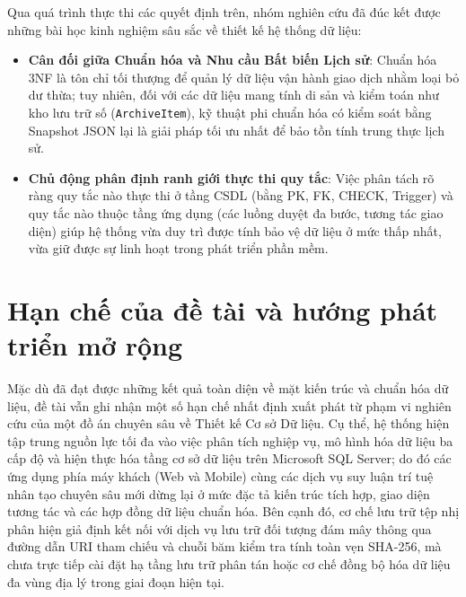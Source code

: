 Qua quá trình thực thi các quyết định trên, nhóm nghiên cứu đã đúc kết được những bài học kinh nghiệm sâu sắc về thiết kế hệ thống dữ liệu:
\begin{itemize}
    \item \textbf{Cân đối giữa Chuẩn hóa và Nhu cầu Bất biến Lịch sử}: Chuẩn hóa 3NF là tôn chỉ tối thượng để quản lý dữ liệu vận hành giao dịch nhằm loại bỏ dư thừa; tuy nhiên, đối với các dữ liệu mang tính di sản và kiểm toán như kho lưu trữ số (\texttt{ArchiveItem}), kỹ thuật phi chuẩn hóa có kiểm soát bằng Snapshot JSON lại là giải pháp tối ưu nhất để bảo tồn tính trung thực lịch sử.
    \item \textbf{Chủ động phân định ranh giới thực thi quy tắc}: Việc phân tách rõ ràng quy tắc nào thực thi ở tầng CSDL (bằng PK, FK, CHECK, Trigger) và quy tắc nào thuộc tầng ứng dụng (các luồng duyệt đa bước, tương tác giao diện) giúp hệ thống vừa duy trì được tính bảo vệ dữ liệu ở mức thấp nhất, vừa giữ được sự linh hoạt trong phát triển phần mềm.
\end{itemize}

\section{Hạn chế của đề tài và hướng phát triển mở rộng}
\label{s:c7_limitations_future}

Mặc dù đã đạt được những kết quả toàn diện về mặt kiến trúc và chuẩn hóa dữ liệu, đề tài vẫn ghi nhận một số hạn chế nhất định xuất phát từ phạm vi nghiên cứu của một đồ án chuyên sâu về Thiết kế Cơ sở Dữ liệu. Cụ thể, hệ thống hiện tập trung nguồn lực tối đa vào việc phân tích nghiệp vụ, mô hình hóa dữ liệu ba cấp độ và hiện thực hóa tầng cơ sở dữ liệu trên Microsoft SQL Server; do đó các ứng dụng phía máy khách (Web và Mobile) cùng các dịch vụ suy luận trí tuệ nhân tạo chuyên sâu mới dừng lại ở mức đặc tả kiến trúc tích hợp, giao diện tương tác và các hợp đồng dữ liệu chuẩn hóa. Bên cạnh đó, cơ chế lưu trữ tệp nhị phân hiện giả định kết nối với dịch vụ lưu trữ đối tượng đám mây thông qua đường dẫn URI tham chiếu và chuỗi băm kiểm tra tính toàn vẹn SHA-256, mà chưa trực tiếp cài đặt hạ tầng lưu trữ phân tán hoặc cơ chế đồng bộ hóa dữ liệu đa vùng địa lý trong giai đoạn hiện tại.

